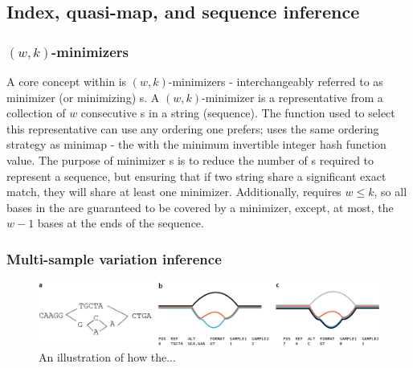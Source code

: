 \subsection{Index, quasi-map, and sequence inference}

\subsubsection{$(w,k)$-minimizers}
A core concept within \pandora{} is $(w,k)$-minimizers \cite{Roberts2004} - interchangeably referred to as minimizer (or minimizing) \kmer{}s. A $(w,k)$-minimizer is a representative \kmer{} from a collection of $w$ consecutive \kmer{}s in a string (sequence). The function used to select this representative can use any ordering one prefers; \pandora{} uses the same ordering strategy as minimap \cite{minimap2016} - the \kmer{} with the minimum invertible integer hash function value. The purpose of minimizer \kmer{}s is to reduce the number of \kmer{}s required to represent a sequence, but ensuring that if two string share a significant exact match, they will share at least one minimizer. Additionally, \pandora{} requires $w\le k$, so all bases in the \prg{} are guaranteed to be covered by a minimizer, except, at most, the $w-1$ bases at the ends of the sequence.



\subsubsection{Multi-sample variation inference}
\label{sec:pandora-compare}


\begin{figure}
\begin{center}
\includegraphics[width=0.95\columnwidth]{Chapter0/Figs/variant_representation.png}
\caption{{An illustration of how the...
{\label{fig:var-representation}}
}}
\end{center}
\end{figure}




